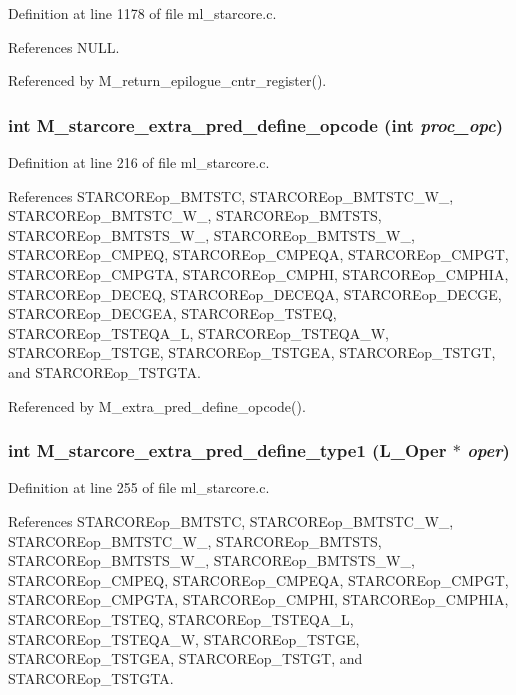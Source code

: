 Definition at line 1178 of file ml\_\-starcore.c.

References NULL.

Referenced by M\_\-return\_\-epilogue\_\-cntr\_\-register().
\subsubsection{\setlength{\rightskip}{0pt plus 5cm}int M\_\-starcore\_\-extra\_\-pred\_\-define\_\-opcode (int {\em proc\_\-opc})}\label{ml__starcore_8c_970f61499ed782bf9be46107f30aa1e5}




Definition at line 216 of file ml\_\-starcore.c.

References STARCOREop\_\-BMTSTC, STARCOREop\_\-BMTSTC\_\-W\_, STARCOREop\_\-BMTSTC\_\-W\_, STARCOREop\_\-BMTSTS, STARCOREop\_\-BMTSTS\_\-W\_, STARCOREop\_\-BMTSTS\_\-W\_, STARCOREop\_\-CMPEQ, STARCOREop\_\-CMPEQA, STARCOREop\_\-CMPGT, STARCOREop\_\-CMPGTA, STARCOREop\_\-CMPHI, STARCOREop\_\-CMPHIA, STARCOREop\_\-DECEQ, STARCOREop\_\-DECEQA, STARCOREop\_\-DECGE, STARCOREop\_\-DECGEA, STARCOREop\_\-TSTEQ, STARCOREop\_\-TSTEQA\_\-L, STARCOREop\_\-TSTEQA\_\-W, STARCOREop\_\-TSTGE, STARCOREop\_\-TSTGEA, STARCOREop\_\-TSTGT, and STARCOREop\_\-TSTGTA.

Referenced by M\_\-extra\_\-pred\_\-define\_\-opcode().
\subsubsection{\setlength{\rightskip}{0pt plus 5cm}int M\_\-starcore\_\-extra\_\-pred\_\-define\_\-type1 (L\_\-Oper $\ast$ {\em oper})}\label{ml__starcore_8c_3f7559a8c16cf363026ca102dc827bf7}




Definition at line 255 of file ml\_\-starcore.c.

References STARCOREop\_\-BMTSTC, STARCOREop\_\-BMTSTC\_\-W\_, STARCOREop\_\-BMTSTC\_\-W\_, STARCOREop\_\-BMTSTS, STARCOREop\_\-BMTSTS\_\-W\_, STARCOREop\_\-BMTSTS\_\-W\_, STARCOREop\_\-CMPEQ, STARCOREop\_\-CMPEQA, STARCOREop\_\-CMPGT, STARCOREop\_\-CMPGTA, STARCOREop\_\-CMPHI, STARCOREop\_\-CMPHIA, STARCOREop\_\-TSTEQ, STARCOREop\_\-TSTEQA\_\-L, STARCOREop\_\-TSTEQA\_\-W, STARCOREop\_\-TSTGE, STARCOREop\_\-TSTGEA, STARCOREop\_\-TSTGT, and STARCOREop\_\-TSTGTA.
